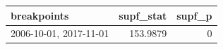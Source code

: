 
\begin{tabular}{lrr}
\toprule
breakpoints & supf\_stat & supf\_p\\
\midrule
2006-10-01, 2017-11-01 & 153.9879 & 0\\
\bottomrule
\end{tabular}
